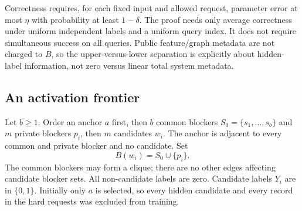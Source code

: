 \documentclass[11pt,a4paper]{article}
\theoremstyle{definition}\newtheorem{definition}[theorem]{Definition}
\begin{document}
Correctness requires, for each fixed input and allowed request, parameter error at most $\eta$ with probability at least $1-\delta$. The proof needs only average correctness under uniform independent labels and a uniform query index. It does not require simultaneous success on all queries. Public feature/graph metadata are not charged to $B$, so the upper-versus-lower separation is explicitly about hidden-label information, not zero versus linear total system metadata.

\subsection{An activation frontier}
Let $b\ge1$. Order an anchor $a$ first, then $b$ common blockers $S_0=\{s_1,\ldots,s_b\}$ and $m$ private blockers $p_i$, then $m$ candidates $w_i$. The anchor is adjacent to every common and private blocker and no candidate. Set
\[
 B(w_i)=S_0\cup\{p_i\}.
\]
The common blockers may form a clique; there are no other edges affecting candidate blocker sets. All non-candidate labels are zero. Candidate labels $Y_i$ are in $\{0,1\}$. Initially only $a$ is selected, so every hidden candidate and every record in the hard requests was excluded from training.
\end{document}

